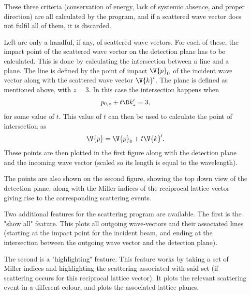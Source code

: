 \documentclass[main.tex]{subfiles}
\begin{document}
	These three criteria (conservation of energy, lack of systemic absence, and proper direction) are all calculated by the program, and if a scattered wave vector does not fulfil all of them, it is discarded.
	
	Left are only a handful, if any, of scattered wave vectors. For each of these, the impact point of the scattered wave vector on the detection plane has to be calculated. This is done by calculating the intersection between a line and a plane. The line is defined by the point of impact $ \V{p}_0 $ of the incident wave vector along with the scattered wave vector $ \V{k}' $. The plane is defined as mentioned above, with $ z=3 $. In this case the intersection happens when
	\begin{equation}
		p_{0,z} + t\D k'_z = 3,
	\end{equation}
	for some value of $ t $. This value of $ t $ can then be used to calculate the point of intersection as
	\begin{equation}
		\V{p} = \V{p}_0 + t \V{k}'.
	\end{equation}
	These points are then plotted in the first figure along with the detection plane and the incoming wave vector (scaled so its length is equal to the wavelength).
	
	The points are also shown on the second figure, showing the top down view of the detection plane, along with the Miller indices of the reciprocal lattice vector giving rise to the corresponding scattering events.
	
	Two additional features for the scattering program are available. The first is the "show all" feature. This plots all outgoing wave-vectors and their associated lines (starting at the impact point for the incident beam, and ending at the intersection between the outgoing wave vector and the detection plane).
	
	The second is a "highlighting" feature. This feature works by taking a set of Miller indices and highlighting the scattering associated with said set (if scattering occurs for this reciprocal lattice vector). It plots the relevant scattering event in a different colour, and plots the associated lattice planes.
	
\end{document}
